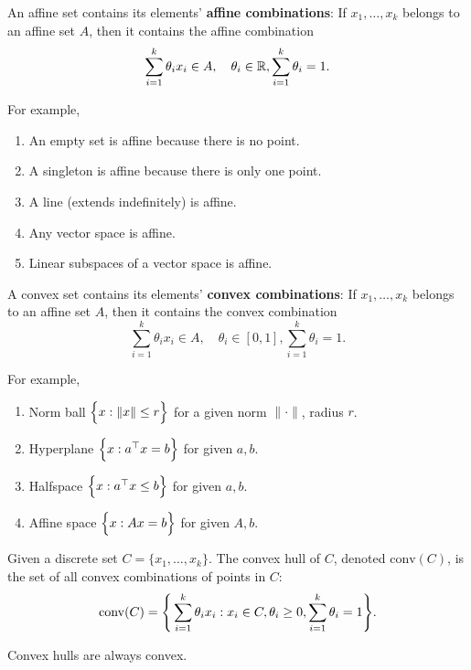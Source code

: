 \begin{definition}
	An affine set contains its elements' \textbf{affine combinations}: If $x_1, \dots, x_k$ belongs to an affine set $A$, then it contains the affine combination
	\begin{equation}
		\sum_{i=1}^k\theta_i x_i\in A, \quad \theta_i\in\mathbb{R}, \sum_{i=1}^k\theta_i = 1.
	\end{equation} 

	\noindent For example,
	\begin{enumerate}
		\item An empty set is affine because there is no point.
		\item A singleton is affine because there is only one point.
		\item A line (extends indefinitely) is affine.
		\item Any vector space is affine.
		\item Linear subspaces of a vector space is affine.	
	\end{enumerate} 
\end{definition} 

\begin{definition}
	A convex set contains its elements' \textbf{convex combinations}: If $x_1, \dots, x_k$ belongs to an affine set $A$, then it contains the convex combination
	\begin{equation}
		\sum_{i=1}^k\theta_i x_i\in A, \quad \theta_i\in [0, 1], \sum_{i=1}^k\theta_i = 1.	
	\end{equation}

	\noindent For example,
	\begin{enumerate}
		\item Norm ball $\Big\{ x:\|x\|\le r \Big\}$ for a given norm $\|\cdot\|$, radius $r$.	
		\item Hyperplane $\Big\{ x:a^\top x = b \Big\}$ for given $a, b$.
		\item Halfspace $\Big\{ x:a^\top x \le b \Big\}$ for given $a, b$.
		\item Affine space $\Big\{ x:Ax = b \Big\}$ for given $A, b$.
	\end{enumerate}  
\end{definition} 

\begin{definition}
	Given a discrete set $C=\{x_1, \dots, x_k\}$. The convex hull of $C$, denoted $\mathrm{conv}(C)$, is the set of all convex combinations of points in $C$:
	\begin{equation}
		\mathrm{conv}(C) = \Bigg\{ 
			\sum_{i=1}^k \theta_ix_i: x_i \in C, \theta_i \ge 0, \sum_{i=1}^k\theta_i = 1 
		 \Bigg\}.
	\end{equation} 	

	\noindent Convex hulls are always convex.
\end{definition} 



